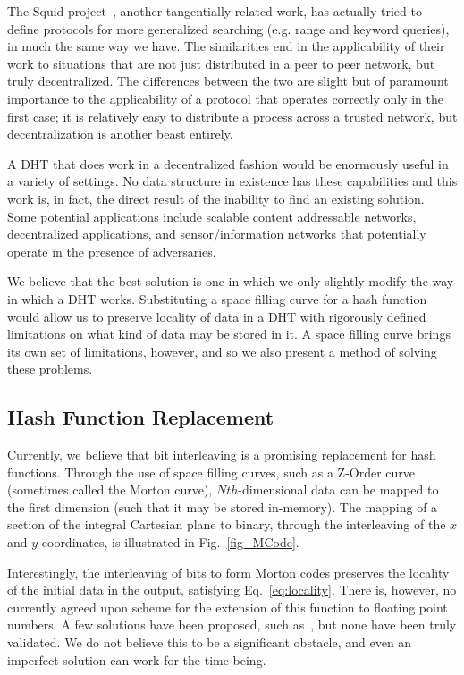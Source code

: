 \documentclass[10pt]{IEEEtran}
\begin{document}
\par The Squid project~\cite{Schmidt:2003cd}, another tangentially related work, has actually tried to define protocols for more generalized searching (e.g. range and keyword queries), in much the same way we have. The similarities end in the applicability of their work to situations that are not just distributed in a peer to peer network, but truly decentralized. The differences between the two are slight but of paramount importance to the applicability of a protocol that operates correctly only in the first case; it is relatively easy to distribute a process across a trusted network, but decentralization is another beast entirely.

\par A DHT that does work in a decentralized fashion would be enormously useful in a variety of settings. No data structure in existence has these capabilities and this work is, in fact, the direct result of the inability to find an existing solution. Some potential applications include scalable content addressable networks, decentralized applications, and sensor/information networks that potentially operate in the presence of adversaries.




\par We believe that the best solution is one in which we only slightly modify the way in which a DHT works. Substituting a space filling curve for a hash function would allow us to preserve locality of data in a DHT with rigorously defined limitations on what kind of data may be stored in it. A space filling curve brings its own set of limitations, however, and so we also present a method of solving these problems.

\subsection{Hash Function Replacement}

\par Currently, we believe that bit interleaving is a promising replacement for hash functions. Through the use of space filling curves, such as a Z-Order curve (sometimes called the Morton curve), $Nth$-dimensional data can be mapped to the first dimension (such that it may be stored in-memory). The mapping of a section of the integral Cartesian plane to binary, through the interleaving of the $x$ and $y$ coordinates, is illustrated in Fig.~\ref{fig_MCode}.

\par Interestingly, the interleaving of bits to form Morton codes preserves the locality of the initial data in the output, satisfying Eq.~\ref{eq:locality}. There is, however, no currently agreed upon scheme for the extension of this function to floating point numbers. A few solutions have been proposed, such as~\cite{Connor:2010eq}, but none have been truly validated. We do not believe this to be a significant obstacle, and even an imperfect solution can work for the time being.
\end{document}
